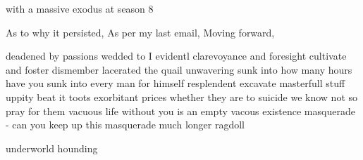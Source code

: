 with a massive exodus at season 8

%
As to why it persisted, As per my last email, Moving forward,


deadened by passions wedded to
I evidentl
clarevoyance and foresight
cultivate and foster
dismember lacerated the quail
unwavering
sunk into how many hours have you sunk into
every man for himself resplendent
excavate
masterfull stuff
uppity
beat it toots
exorbitant prices
whether they are to suicide we know not so pray for them
vacuous life without you is an empty vacous existence
masquerade - can you keep up this masquerade much longer
ragdoll

underworld
hounding

